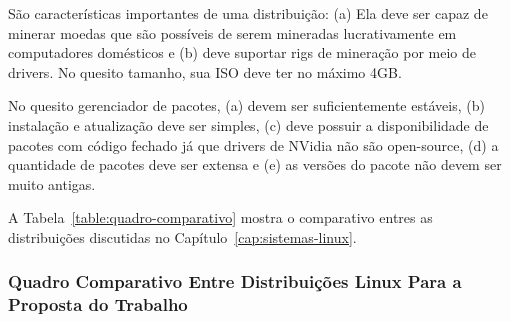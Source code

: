 \documentclass[
article,			%
12pt,				%
openright,			%
oneside,			%
a4paper,			%
chapter=TITLE,		%
section=TITLE,		%
subsection=TITLE,	%
subsubsection=TITLE,%
subsubsubsection=TITLE, %
english,			%
brazil,				%
]{abntex2}
\begin{document}
São características importantes de uma distribuição: (a) Ela deve ser
capaz de minerar moedas que são possíveis de serem mineradas
lucrativamente em computadores domésticos e (b) deve suportar rigs de
mineração por meio de drivers. No quesito tamanho, sua ISO deve ter no
máximo 4GB\@.

No quesito gerenciador de pacotes, (a) devem ser suficientemente
estáveis, (b) instalação e atualização deve ser simples, (c) deve
possuir a disponibilidade de pacotes com código fechado já que drivers
de NVidia não são open-source, (d) a quantidade de pacotes deve ser
extensa e (e) as versões do pacote não devem ser muito antigas.

A Tabela~\ref{table:quadro-comparativo} mostra o comparativo entres as
distribuições discutidas no Capítulo~\ref{cap:sistemas-linux}.

\subsubsection{Quadro Comparativo Entre Distribuições Linux Para a
Proposta do Trabalho}

\begin{table}[H]
    \centering
    \caption{\label{table:quadro-comparativo}Quadro Comparativo Entre
    Distribuições Linux}
\end{table}

\pagebreak 
\end{document}
